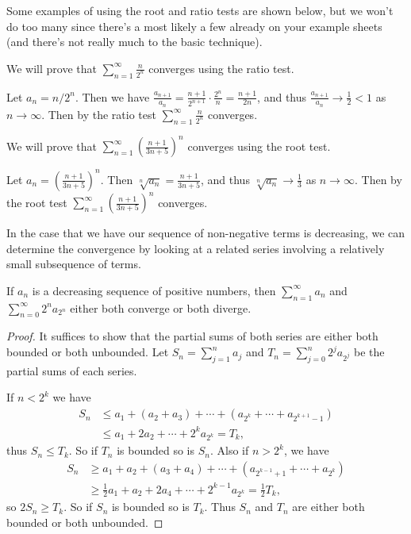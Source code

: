 Some examples of using the root and ratio tests are shown below, but we won't do too many since there's a most likely a few already on your example sheets (and there's not really much to the basic technique).

\begin{example}
	We will prove that $\sum_{n = 1}^{\infty} \frac{n}{2^n}$ converges using the ratio test.

	Let $a_n = n/2^n$. Then we have $\frac{a_{n + 1}}{a_n} = \frac{n + 1}{2^{n + 1}} \cdot \frac{2^n}{n} = \frac{n + 1}{2n}$, and thus $\frac{a_{n + 1}}{a_n} \rightarrow \frac{1}{2} < 1$ as $n \rightarrow \infty$. Then by the ratio test $\sum_{n = 1}^{\infty} \frac{n}{2^n}$ converges.
\end{example}

\begin{example}
	We will prove that $\sum_{n = 1}^{\infty} \left(\frac{n + 1}{3n + 5}\right)^n$ converges using the root test.

	Let $a_n = (\frac{n + 1}{3n + 5})^n$. Then $\sqrt[n]{a_n} = \frac{n + 1}{3n + 5}$, and thus $\sqrt[n]{a_n} \rightarrow \frac{1}{3}$ as $n \rightarrow \infty$. Then by the root test $\sum_{n = 1}^{\infty} \left(\frac{n + 1}{3n + 5}\right)^n$ converges.
\end{example}

In the case that we have our sequence of non-negative terms is decreasing, we can determine the convergence by looking at a related series involving a relatively small subsequence of terms.

\begin{theorem}
	If $a_n$ is a decreasing sequence of positive numbers, then $\sum_{n = 1}^{\infty} a_n$ and $\sum_{n = 0}^{\infty} 2^n a_{2^n}$ either both converge or both diverge.
\end{theorem}
\begin{proof}
It suffices to show that the partial sums of both series are either both bounded or both unbounded.
Let $S_n = \sum_{j = 1}^{n} a_j$ and $T_n = \sum_{j = 0}^n 2^j a_{2^j}$ be the partial sums of each series.

If $n < 2^k$ we have
\begin{align*}
	S_n &\leq a_1 + (a_2 + a_3) + \cdots + (a_{2^k} + \cdots + a_{2^{k + 1} - 1}) \\
	&\leq a_1 + 2 a_2 + \cdots + 2^k a_{2^k} = T_k,
\end{align*}
thus $S_n \leq T_k$. So if $T_n$ is bounded so is $S_n$. Also if $n > 2^k$, we have
\begin{align*}
	S_n &\geq a_1 + a_2 + (a_3 + a_4) + \cdots + (a_{2^{k -1}+1} + \cdots + a_{2^k}) \\
	&\geq \frac{1}{2}a_1 + a_2 + 2 a_4 + \cdots + 2^{k - 1}a_{2^k} = \frac{1}{2}T_k,
\end{align*}
so $2S_n \geq T_k$. So if $S_n$ is bounded so is $T_k$.
Thus $S_n$ and $T_n$ are either both bounded or both unbounded. 
\end{proof}


